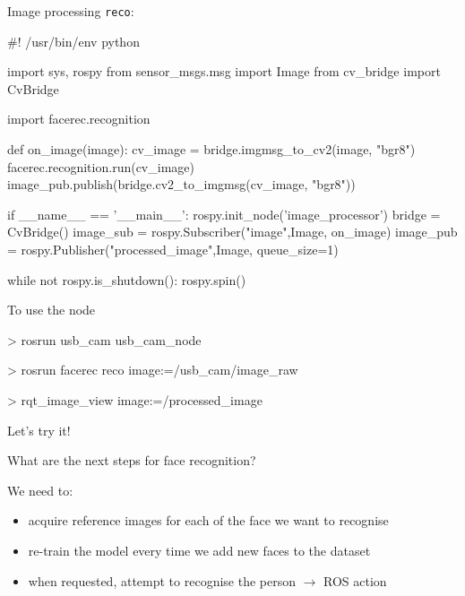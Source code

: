 \documentclass[compress]{beamer}
\begin{document}
\begin{frame}[fragile]{Image processing}
\texttt{reco}:
\begin{pythoncode}
#! /usr/bin/env python

import sys, rospy
from sensor_msgs.msg import Image
from cv_bridge import CvBridge

import facerec.recognition

def on_image(image):
    cv_image = bridge.imgmsg_to_cv2(image, "bgr8")
    facerec.recognition.run(cv_image)
    image_pub.publish(bridge.cv2_to_imgmsg(cv_image, "bgr8"))

if __name__ == '__main__':
    rospy.init_node('image_processor')
    bridge = CvBridge()
    image_sub = rospy.Subscriber("image",Image, on_image)
    image_pub = rospy.Publisher("processed_image",Image, queue_size=1)

    while not rospy.is_shutdown():
        rospy.spin()
\end{pythoncode}

\end{frame}

\begin{frame}[fragile]{To use the node}


\begin{shcode}
> rosrun usb_cam usb_cam_node
\end{shcode}


\begin{shcode}
> rosrun facerec reco image:=/usb_cam/image_raw
\end{shcode}


\begin{shcode}
> rqt_image_view image:=/processed_image
\end{shcode}

\end{frame}


\begin{frame}[plain]
    \begin{center}
        \Large
    Let's try it!
    \end{center}
\end{frame}


\begin{frame}{What are the next steps for face recognition?}

    We need to:
    \begin{itemize}
        \item acquire reference images for each of the face we want to recognise
        \item re-train the model every time we add new faces to the dataset
        \item when requested, attempt to recognise the person $\rightarrow$ ROS
            action
    \end{itemize}
\end{frame}
\end{document}
